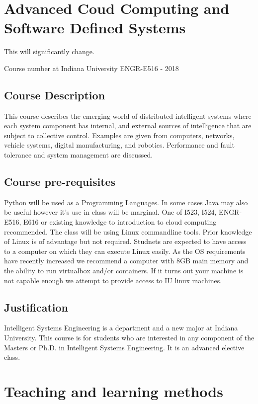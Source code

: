 \CHANGE

\section{Advanced Coud Computing and Software Defined Systems}

This will significantly change.

Course number at Indiana University ENGR-E516 - 2018

\subsection{Course Description}

This course describes the emerging world of distributed intelligent
systems where each system component has internal, and external sources
of intelligence that are subject to collective control. Examples are
given from computers, networks, vehicle systems, digital
manufacturing, and robotics. Performance and fault tolerance and
system management are discussed.

\subsection{Course pre-requisites}

Python will be used as a Programming Languages. In some cases Java may
also be useful however it's use in class will be marginal. One of
I523, I524, ENGR-E516, E616 or existing knowledge to introduction to
cloud computing recommended. The class will be using Linux commandline
tools. Prior knowledge of Linux is of advantage but not required.
Studnets are expected to have access to a computer on which they can
execute Linux easily. As the OS requirements have recently increased
we recommend a computer with 8GB main memory and the ability to run
virtualbox and/or containers. If it turns out your machine is not
capable enough we attempt to provide access to IU linux machines.

\subsection{Justification}

Intelligent Systems Engineering is a department and a new major at
Indiana University. This course is for students who are interested in
any component of the Masters or Ph.D. in Intelligent Systems
Engineering. It is an advanced elective class.

\section{Teaching and learning methods}

